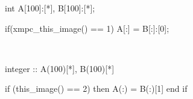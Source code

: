 \begin{minipage}{0.45\hsize}
\begin{center}
\begin{XCexample}
int A[100]:[*], B[100]:[*];

if(xmpc_this_image() == 1){
  A[:] = B[:]:[0];
}
\end{XCexample}
\end{center}
\end{minipage}
~
\begin{minipage}{0.45\hsize}
\begin{center}
\begin{XFexampleR}
integer :: A(100)[*], B(100)[*]

if (this_image() == 2) then
  A(:) = B(:)[1]
end if
\end{XFexampleR}
\end{center}
\end{minipage}

